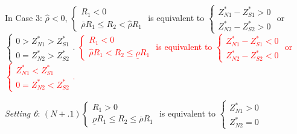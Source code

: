 \documentclass[10pt]{article}
\newcommand{\hhred}{\textcolor{red}}
\begin{document}
In Case 3: $ {\hat \rho} < 0 $, $ \left\{ \begin{matrix} R_1 < 0 \\ \overline{\rho} R_1 \leqslant R_2 < {\hat \rho} R_1 \end{matrix} \right. $ is equivalent to $ \left\{ \begin{matrix} Z_{N 1}^* - Z_{S 1}^* > 0 \\ Z_{N 2}^* - Z_{S 2}^* > 0 \end{matrix} \right. $ or $ \left\{ \begin{matrix} 0 > Z_{N 1}^* > Z_{S 1}^* \\ 0 = Z_{N 2}^* > Z_{S 2}^* \end{matrix} \right. $.
\hhred{$ \left\{ \begin{matrix} R_1 < 0 \\ {\hat \rho} R_1 < R_2 \leqslant \underline{\rho} R_1 \end{matrix} \right. $ is equivalent to $ \left\{ \begin{matrix} Z_{N 1}^* - Z_{S 1}^* < 0 \\ Z_{N 2}^* - Z_{S 2}^* < 0 \end{matrix} \right. $ or $ \left\{ \begin{matrix} Z_{N 1}^* < Z_{S 1}^* \\ 0 = Z_{N 2}^* < Z_{S 2}^* \end{matrix} \right. $.}

{\it Setting 6}: $ (N+.1) \left\{ \begin{matrix} R_1 > 0 \\ \underline{\rho} R_1 \leqslant R_2 \leqslant \overline{\rho} R_1 \end{matrix} \right. $ is equivalent to $ \left\{ \begin{matrix} Z_{N 1}^* > 0 \\ Z_{N 2}^* = 0 \end{matrix} \right. $
\end{document}
